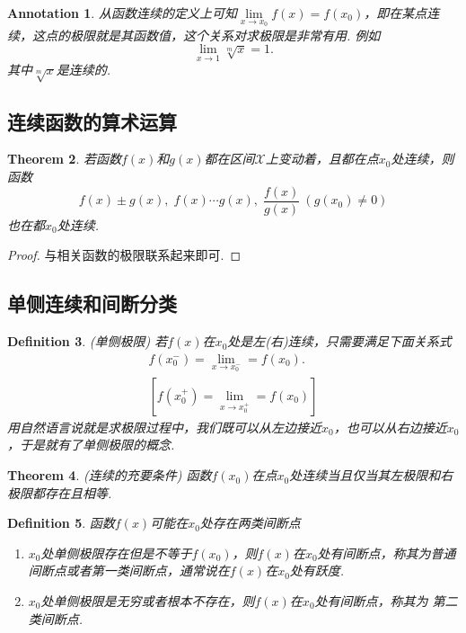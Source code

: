 \documentclass{article}
\newtheorem{theorem}{Theorem}[section]
\newtheorem{definition}[theorem]{Definition}
\newtheorem{annotation}[theorem]{Annotation}
\begin{document}
\begin{annotation}
\rm 从函数连续的定义上可知$\lim\limits_{x \rightarrow x_0}f(x) = f(x_0)$，即在某点连续，这点的极限就是其函数值，这个关系对求极限是非常有用. 例如
$$
\lim\limits_{x \rightarrow 1} \sqrt[m]{x} = 1.
$$
其中$\sqrt[m]{x}$是连续的.
\end{annotation}


\subsection{连续函数的算术运算}

\begin{theorem}
\rm 若函数$f(x)$和$g(x)$都在区间$\mathcal{X}$上变动着，且都在点$x_0$处连续，则函数
$$
f(x) \pm g(x),\; f(x)\cdots g(x), \; \frac{f(x)}{g(x)}~(g(x_0) \neq 0)
$$
也在都$x_0$处连续.
\end{theorem}

\begin{proof}
{\color{blue}与相关函数的极限联系起来即可}.
\end{proof}

\subsection{单侧连续和间断分类}

\begin{definition}
\rm {\color{red} (单侧极限) }若$f(x)$在$x_0$处是左(右)连续，只需要满足下面关系式
$$
\begin{array}{ll}
f(x_0^-) = \lim\limits_{x \rightarrow x_0^-} = f(x_0). \\
\left[ f(x_0^+) = \lim\limits_{x \rightarrow x_0^+} = f(x_0) \right]
\end{array}
$$
{\color{blue}用自然语言说就是求极限过程中，我们既可以从左边接近$x_0$，也可以从右边接近$x_0$，于是就有了单侧极限的概念}.
\end{definition}

\begin{theorem}
\rm {\color{red} (连续的充要条件)} 函数$f(x_0)$在点$x_0$处连续当且仅当其左极限和右极限都存在且相等.
\end{theorem}

\begin{definition}
\rm 函数$f(x)$可能在$x_0$处存在两类间断点
\begin{enumerate}
	\item $x_0$处单侧极限存在但是不等于$f(x_0)$，则$f(x)$在$x_0$处有间断点，称其为{\color{red}普通间断点}或者{\color{red}第一类间断点}，通常说在$f(x)$在$x_0$处有{\color{red}跃度}.
	\item $x_0$处单侧极限是无穷或者根本不存在，则$f(x)$在$x_0$处有间断点，称其为{\color{red} 第二类间断点}.
\end{enumerate}
\end{definition}
\end{document}

